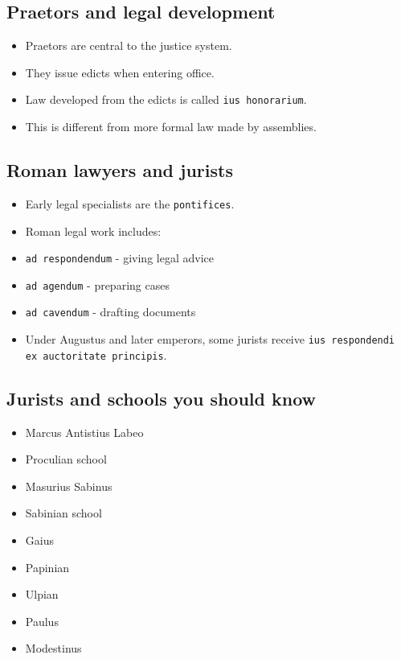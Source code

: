 \documentclass[11pt]{article}
\begin{document}
\subsection{Praetors and legal development}

\begin{itemize}
\item Praetors are central to the justice system.
\item They issue edicts when entering office.
\item Law developed from the edicts is called \texttt{ius honorarium}.
\item This is different from more formal law made by assemblies.
\end{itemize}

\subsection{Roman lawyers and jurists}

\begin{itemize}
\item Early legal specialists are the \texttt{pontifices}.
\item Roman legal work includes:
\item \texttt{ad respondendum} - giving legal advice
\item \texttt{ad agendum} - preparing cases
\item \texttt{ad cavendum} - drafting documents
\item Under Augustus and later emperors, some jurists receive \texttt{ius respondendi ex auctoritate principis}.
\end{itemize}

\subsection{Jurists and schools you should know}

\begin{itemize}
\item Marcus Antistius Labeo
\item Proculian school
\item Masurius Sabinus
\item Sabinian school
\item Gaius
\item Papinian
\item Ulpian
\item Paulus
\item Modestinus
\end{itemize}
\end{document}
